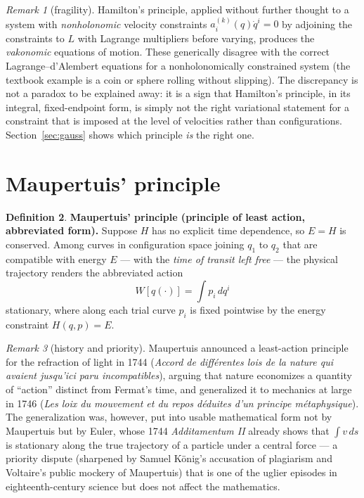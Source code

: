 \documentclass[11pt]{book}
\theoremstyle{definition}
\newtheorem{definition}{Definition}[section]
\theoremstyle{plain}
\theoremstyle{remark}
\newtheorem{remark}[definition]{Remark}
\begin{document}
\begin{remark}[fragility]
\label{rem:fragility}
Hamilton's principle, applied without further thought to a system with \emph{nonholonomic} velocity constraints $a^{(k)}_i(q)\dot q^i=0$ by adjoining the constraints to $L$ with Lagrange multipliers before varying, produces the \emph{vakonomic} equations of motion. These generically disagree with the correct Lagrange--d'Alembert equations for a nonholonomically constrained system (the textbook example is a coin or sphere rolling without slipping). The discrepancy is not a paradox to be explained away: it is a sign that Hamilton's principle, in its integral, fixed-endpoint form, is simply not the right variational statement for a constraint that is imposed at the level of velocities rather than configurations. Section~\ref{sec:gauss} shows which principle \emph{is} the right one.
\end{remark}

\section{Maupertuis' principle}
\label{sec:maupertuis}

\begin{definition}
\label{def:maupertuis-old}
\textbf{Maupertuis' principle (principle of least action, abbreviated form).} Suppose $H$ has no explicit time dependence, so $E=H$ is conserved. Among curves in configuration space joining $q_1$ to $q_2$ that are compatible with energy $E$ --- with the \emph{time of transit left free} --- the physical trajectory renders the abbreviated action
\[
W[q(\cdot)] = \int p_i\,dq^i
\]
stationary, where along each trial curve $p_i$ is fixed pointwise by the energy constraint $H(q,p)=E$.
\end{definition}

\begin{remark}[history and priority]
Maupertuis announced a least-action principle for the refraction of light in 1744 (\emph{Accord de différentes lois de la nature qui avaient jusqu'ici paru incompatibles}), arguing that nature economizes a quantity of ``action'' distinct from Fermat's time, and generalized it to mechanics at large in 1746 (\emph{Les loix du mouvement et du repos déduites d'un principe métaphysique}). The generalization was, however, put into usable mathematical form not by Maupertuis but by Euler, whose 1744 \emph{Additamentum II} already shows that $\int v\,ds$ is stationary along the true trajectory of a particle under a central force --- a priority dispute (sharpened by Samuel König's accusation of plagiarism and Voltaire's public mockery of Maupertuis) that is one of the uglier episodes in eighteenth-century science but does not affect the mathematics.
\end{remark}
\end{document}
